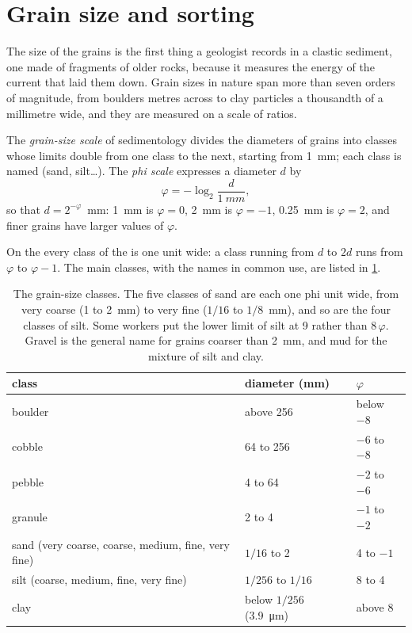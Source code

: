 \section{Grain size and sorting}\label{sec:b1:clastic-sediments:grain-size}

The size of the grains is the first thing a geologist records in a clastic
sediment, one made of fragments of older rocks, because it measures the energy
of the current that laid them down. Grain sizes in nature span more than seven
orders of magnitude, from boulders metres across to clay particles a thousandth
of a millimetre wide, and they are measured on a scale of ratios.

\begin{definition}\label{def:b1:clastic-sediments:grain-size}
The \emph{grain-size scale} of sedimentology divides the
diameters of grains into classes whose limits double from one class to the
next, starting from \qty{1}{mm}; each class is named (sand, silt\ldots). The
\emph{phi scale} expresses a diameter $d$ by
\[
  \varphi = -\log_2 \frac{d}{\qty{1}{mm}},
\]
so that $d = 2^{-\varphi}$~mm: \qty{1}{mm} is $\varphi = 0$, \qty{2}{mm} is
$\varphi = -1$, \qty{0.25}{mm} is $\varphi = 2$, and finer grains have larger
values of $\varphi$.
\end{definition}

On the  every class of the  is one unit wide: a class
running from $d$ to $2d$ runs from $\varphi$ to $\varphi - 1$. The main classes,
with the names in common use, are listed in \cref{tab:b1:clastic-sediments:classes}.

\begin{table}[htbp]
\centering\small
\begin{tabular}{@{}lll@{}}
\hline
class & diameter (\si{mm}) & $\varphi$ \\
\hline
boulder & above 256 & below $-8$ \\
cobble & 64 to 256 & $-6$ to $-8$ \\
pebble & 4 to 64 & $-2$ to $-6$ \\
granule & 2 to 4 & $-1$ to $-2$ \\
sand (very coarse, coarse, medium, fine, very fine) & $1/16$ to 2 & 4 to $-1$ \\
silt (coarse, medium, fine, very fine) & $1/256$ to $1/16$ & 8 to 4 \\
clay & below $1/256$ (\qty{3.9}{\micro m}) & above 8 \\
\hline
\end{tabular}
\caption{The grain-size classes. The five classes of sand are each one phi
unit wide, from very coarse (1 to \qty{2}{mm}) to very fine ($1/16$ to
$1/8$~mm), and so are the four classes of silt. Some workers put the lower
limit of silt at 9 rather than $8\,\varphi$. Gravel is the general name for
grains coarser than \qty{2}{mm}, and mud for the mixture of silt and clay.}
\label{tab:b1:clastic-sediments:classes}
\end{table}

